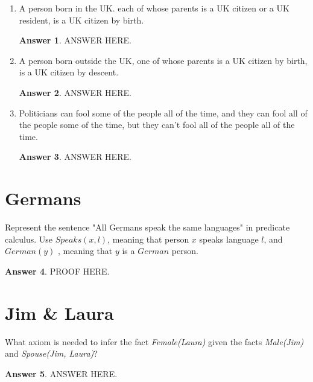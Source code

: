 \documentclass[a4paper]{article}
\renewcommand{\(}{\left(}
\renewcommand{\)}{\right)}
\theoremstyle{plain}
\theoremstyle{plain}
\theoremstyle{definition}
\newtheorem*{answer}{Answer}
\begin{document}
\begin{enumerate}[label*=\alph*.,ref=\alph*]
\item A person born in the UK. each of whose parents is a UK citizen or a UK resident, is a UK citizen by birth.
\begin{shaded}
\begin{answer}
ANSWER HERE.
\end{answer}
\end{shaded}

\item A person born outside the UK, one of whose parents is a UK citizen by birth, is a UK citizen by descent.
\begin{shaded}
\begin{answer}
ANSWER HERE.
\end{answer}
\end{shaded}

\item Politicians can fool some of the people all of the time, and they can fool all of the people some of the time, but they can't fool all of the people all of the time.
\begin{shaded}
\begin{answer}
ANSWER HERE.
\end{answer}
\end{shaded}


\end{enumerate}
\section{Germans}
 Represent the sentence "All Germans speak the same
languages" in predicate calculus. Use $Speaks(x,l)$, meaning that person $x$ speaks
language $l$, and $German(y)$ , meaning that $y$ is a $German$ person.
\begin{shaded}
\begin{answer}
PROOF HERE.
\end{answer}
\end{shaded}

\section{Jim \& Laura}
What axiom is needed to infer the fact \textit{Female(Laura)} given the facts \textit{Male(Jim)} and \textit{Spouse(Jim, Laura)}?

\begin{shaded}
\begin{answer}
ANSWER HERE.
\end{answer}
\end{shaded}
\end{document}
